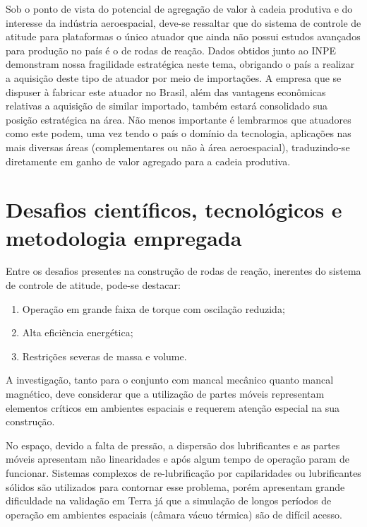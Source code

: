 Sob o ponto de vista do potencial de agregação de valor à cadeia produtiva e do interesse da indústria aeroespacial, deve-se ressaltar que do sistema de controle de atitude para plataformas o único atuador que ainda não possui estudos avançados para produção no país é o de rodas de reação. Dados obtidos junto ao INPE demonstram nossa fragilidade estratégica neste tema, obrigando o país a realizar a aquisição deste tipo de atuador por meio de importações. A empresa que se dispuser à fabricar este atuador no Brasil, além das vantagens econômicas relativas a aquisição de similar importado, também estará consolidado sua posição estratégica na área. Não menos importante é lembrarmos que atuadores como este podem, uma vez tendo o país o domínio da tecnologia, aplicações nas mais diversas áreas (complementares ou não à área aeroespacial), traduzindo-se diretamente em ganho de valor agregado para a cadeia produtiva. 

 
 
\section{Desafios científicos, tecnológicos e metodologia empregada} \label{sec:Desafios}

Entre os desafios presentes na construção de rodas de reação, inerentes do sistema de controle de atitude, pode-se destacar:

\begin{enumerate}
	\item Operação em grande faixa de torque com oscilação reduzida;
	\item Alta eficiência energética;
	\item Restrições severas de massa e volume.
\end{enumerate}

A investigação, tanto para o conjunto com mancal mecânico quanto mancal magnético, deve considerar que a utilização de partes móveis representam elementos críticos em ambientes espaciais \cite{nasaSTD4003} e requerem atenção especial na sua construção. 

No espaço, devido a falta de pressão, a dispersão dos lubrificantes \cite{silverman1995space, miyoshi2007solid} e as partes móveis apresentam não linearidades e após algum tempo de operação param de funcionar. Sistemas complexos de re-lubrificação por capilaridades ou lubrificantes sólidos são utilizados para contornar esse problema, porém apresentam grande dificuldade na validação em Terra já que a simulação de longos períodos de operação em ambientes espaciais (câmara vácuo térmica) são de difícil acesso. 

